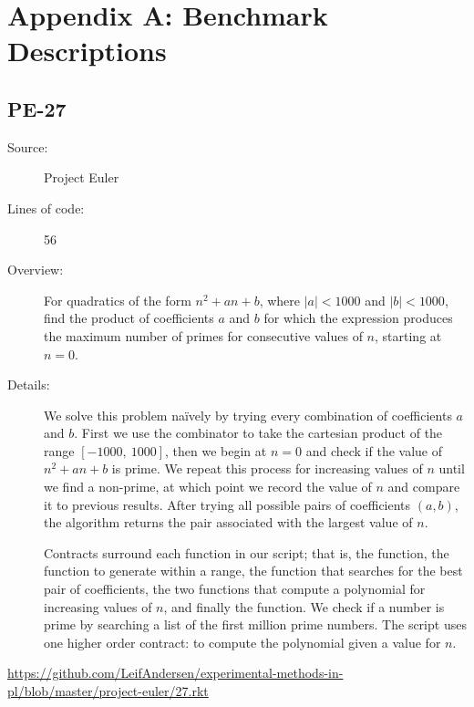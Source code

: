 \newpage
\appendix
\section*{Appendix A: Benchmark Descriptions}
\label{appendix}

\subsection*{PE-27~\hrulefill}
\begin{description}
\item[Source:] Project Euler
\item[Lines of code:] 56
\item[Overview:] For quadratics of the form $n^2 + an + b$, where $|a| < 1000$ and $|b| < 1000$, find the product of coefficients $a$ and $b$ for which the expression produces the maximum number of primes for consecutive values of $n$, starting at $n=0$.
\item[Details:] 
  We solve this problem na\"ively by trying every combination of coefficients $a$ and $b$.
  First we use the  combinator to take the cartesian product of the range $[-1000,~1000]$, then we begin at $n=0$ and check if the value of $n^2 + an + b$ is prime.
  We repeat this process for increasing values of $n$ until we find a non-prime, at which point we record the value of $n$ and compare it to previous results.
  After trying all possible pairs of coefficients $(a,b)$, the algorithm returns the pair associated with the largest value of $n$.

  Contracts surround each function in our script; that is, the  function, the function to generate  within a range, the function  that searches for the best pair of coefficients, the two functions that compute a polynomial for increasing values of $n$, and finally the  function.
  We check if a number is prime by searching a list of the first million prime numbers.
  The script uses one higher order contract: to compute the polynomial given a value for $n$.
\end{description}
\url{https://github.com/LeifAndersen/experimental-methods-in-pl/blob/master/project-euler/27.rkt}

